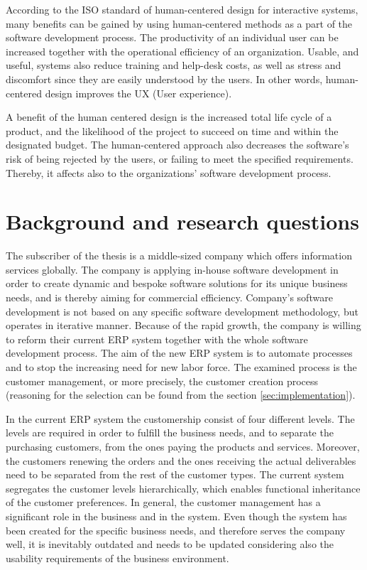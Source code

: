 \documentclass[12pt,a4paper,oneside,pdftex]{report}
\begin{document}
\indent According to the ISO standard of human-centered design for interactive systems, many benefits can be gained by using human-centered methods as a part of the software development process. The productivity of an individual user can be increased together with the operational efficiency of an organization. Usable, and useful, systems also reduce training and help-desk costs, as well as stress and discomfort since they are easily understood by the users. In other words, human-centered design improves the UX (User experience). \citep{RefWorks:40}

A benefit of the human centered design is the increased total life cycle of a product, and the likelihood of the project to succeed on time and within the designated budget. The human-centered approach also decreases the software's risk of being rejected by the users, or failing to meet the specified requirements. \citep{RefWorks:40} Thereby, it affects also to the organizations' software development process.

\section{Background and research questions}
\label{sec:background}
The subscriber of the thesis is a middle-sized company which offers information services globally. The company is applying in-house software development in order to create dynamic and bespoke software solutions for its unique business needs, and is thereby aiming for commercial efficiency. Company's software development is not based on any specific software development methodology, but operates in iterative manner. Because of the rapid growth, the company is willing to reform their current ERP system together with the whole software development process. The aim of the new ERP system is to automate processes and to stop the increasing need for new labor force. The examined process is the customer management, or more precisely, the customer creation process  (reasoning for the selection can be found from the section \ref{sec:implementation}). 

In the current ERP system the customership consist of four different levels. The levels are required in order to fulfill the business needs, and to separate the purchasing customers, from the ones paying the products and services. Moreover, the customers renewing the orders and the ones receiving the actual deliverables need to be separated from the rest of the customer types. The current system segregates the customer levels hierarchically, which enables functional inheritance of the customer preferences. In general, the customer management has a significant role in the business and in the system. Even though the system has been created for the specific business needs, and therefore serves the company well, it is inevitably outdated and needs to be updated considering also the usability requirements of the business environment.
\end{document}
